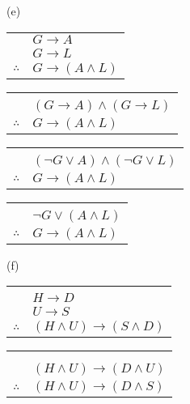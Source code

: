 \documentclass{article}
\begin{document}
(e) \newline
\begin{tabular}{c@{\,}l@{}} 
                         & $G \rightarrow A$ \\
                         & $G \rightarrow L$ \\
\arrayrulecolor{blue}
\cline{2-2}
    $\therefore$         & $G \rightarrow (A \wedge L)$ \\
\end{tabular}
\begin{tabular}{c@{\,}l@{}} 
                         & \\
                         & $(G \rightarrow A) \wedge (G \rightarrow L)$ \\
\arrayrulecolor{blue}
\cline{2-2}
    $\therefore$         & $G \rightarrow (A \wedge L)$ \\
\end{tabular}
\begin{tabular}{c@{\,}l@{}} 
                         & \\
                         & $(\neg G \vee A) \wedge (\neg G \vee L)$ \\
\arrayrulecolor{blue}
\cline{2-2}
    $\therefore$         & $G \rightarrow (A \wedge L)$ \\
\end{tabular}
\begin{tabular}{c@{\,}l@{}} 
                         & \\
                         & $\neg G \vee (A \wedge L)$ \\
\arrayrulecolor{blue}
\cline{2-2}
    $\therefore$         & $G \rightarrow (A \wedge L)$ \\
\end{tabular}
\newline
(f)  \newline
\begin{tabular}{c@{\,}l@{}} 
                         & \\
                         & $H \rightarrow D$ \\
                         & $U \rightarrow S$ \\
\arrayrulecolor{blue}
\cline{2-2}
    $\therefore$         & $(H \wedge U) \rightarrow (S \wedge D)$ \\
\end{tabular}
\begin{tabular}{c@{\,}l@{}} 
                         & \\ & \\
                         & $(H \wedge U) \rightarrow (D \wedge U)$ \\
\arrayrulecolor{blue}
\cline{2-2}
    $\therefore$         & $(H \wedge U) \rightarrow (D \wedge S)$ \\
\end{tabular}
\end{document}
